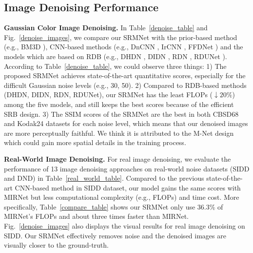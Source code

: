 \documentclass{article}
\begin{document}
\subsection{Image Denoising Performance}
\noindent\textbf{Gaussian Color Image Denoising.} In Table~\ref{denoise_table} and Fig.~\ref{denoise_images}, we compare our SRMNet with the prior-based method (e.g., BM3D \cite{01}), CNN-based methods (e.g., DnCNN \cite{04}, IrCNN \cite{17}, FFDNet \cite{16}) and the models which are based on RDB (e.g., DHDN \cite{14}, DIDN \cite{44}, RDN \cite{07}, RDUNet \cite{15}). According to Table~\ref{denoise_table}, we could observe three things: 1) The proposed SRMNet achieves state-of-the-art quantitative scores, especially for the difficult Gaussian noise levels (e.g., 30, 50). 2) Compared to RDB-based methods (DHDN, DIDN, RDN, RDUNet), our SRMNet has the least FLOPs ($\downarrow 20\%$) among the five models, and still keeps the best scores because of the efficient SRB design. 3) The SSIM scores of the SRMNet are the best in both CBSD68 and Kodak24 datasets for each noise level, which means that our denoised images are more perceptually faithful. We think it is attributed to the M-Net design which could gain more spatial details in the training process.

\noindent\textbf{Real-World Image Denoising.} For real image denoising, we evaluate the performance of 13 image denoising approaches on real-world noise datasets (SIDD and DND) in Table~\ref{real_world_table}. Compared to the previous state-of-the-art CNN-based method \cite{20} in SIDD dataset, our model gains the same scores with MIRNet but less computational complexity (e.g., FLOPs) and time cost. More specifically, Table~\ref{compare_table} shows our SRMNet only use 36.3\% of MIRNet's FLOPs and about three times faster than MIRNet. Fig.~\ref{denoise_images} also displays the visual results for real image denoising on SIDD. Our SRMNet effectively removes noise and the denoised images are visually closer to the ground-truth.
\end{document}
